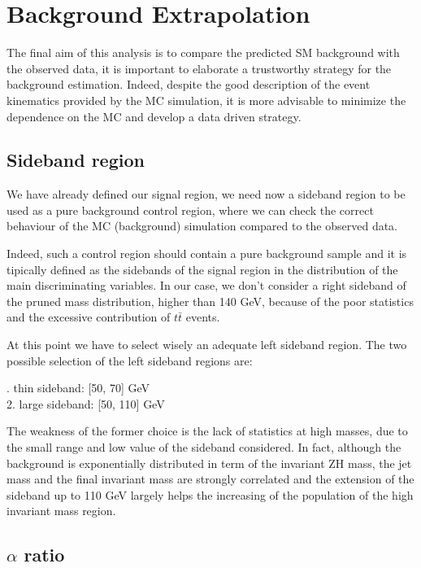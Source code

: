 \documentclass[12pt]{article} %
\begin{document}
\section{Background Extrapolation} %

The final aim of this analysis is to compare the predicted SM background with the observed data, it is important to elaborate a trustworthy strategy for the background estimation. Indeed, despite the good description of the event kinematics provided by the MC simulation, it is more advisable to minimize the dependence on the MC and develop a data driven strategy. 


\subsection{Sideband region} %

We have already defined our signal region, we need now a sideband region to be used as a pure background control region, where we can check the correct behaviour of the MC (background) simulation compared to the observed data. 

Indeed, such a control region should contain a pure background sample and it is tipically defined as the sidebands of the signal region in the distribution of the main discriminating variables. In our case, we don't consider a right sideband of the pruned mass distribution, higher than 140 GeV, because of the poor statistics and the excessive contribution of $t\bar{t}$ events.

At this point we have to select wisely an adequate left sideband region. The two possible selection of the left sideband regions are:

. thin sideband: [50, 70] GeV \\
2. large sideband: [50, 110] GeV 

The weakness of the former choice is the lack of statistics at high masses, due to the small range and low value of the sideband considered. In fact, although the background is exponentially distributed in term of the invariant ZH mass, the jet mass and the final invariant mass are strongly correlated and the extension of the sideband up to 110 GeV largely helps the increasing of the population of the high invariant mass region.


\subsection{$\alpha$ ratio} %
\end{document}
